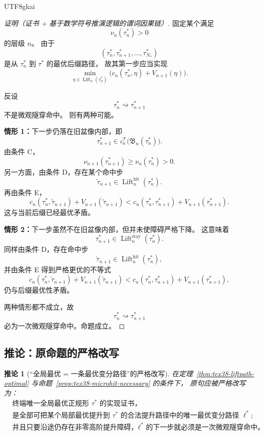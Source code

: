 \documentclass[12pt]{article}
\newtheorem{corollary}{推论}[section]
\newcommand{\Lift}{\operatorname{Lift}}
\begin{document}
\begin{CJK*}{UTF8}{gkai}
\begin{proof}[证明（证书 + 基于数学符号推演逻辑的谓词因果链）]
固定某个满足
\[
  \nu_n(\tau_n^\ast)>0
\]
的层级 $n$。
由于
\[
  (\tau_n^\ast,\tau_{n+1}^\ast,\dots,\tau_{N_\ast}^\ast)
\]
是从 $\tau_n^\ast$ 到 $\tau^\ast$ 的最优后缀路径，
故其第一步应当实现
\[
  \min_{\eta\in\Lift_n(\tau_n^\ast)}
  \bigl(
    c_n(\tau_n^\ast,\eta)+V_{n+1}(\eta)
  \bigr).
\]

反设
\[
  \tau_n^\ast\rightsquigarrow\tau_{n+1}^\ast
\]
不是微观隧穿命中。
则有两种可能。

\textbf{情形 1：}下一步仍落在旧盆像内部，即
\[
  \tau_{n+1}^\ast\in \iota_n^{\mathcal T}\bigl(\mathfrak B_n(\tau_n^\ast)\bigr).
\]
由条件 C，
\[
  \nu_{n+1}(\tau_{n+1}^\ast)\ge \nu_n(\tau_n^\ast)>0.
\]
另一方面，由条件 D，存在某个命中步
\[
  \widetilde\tau_{n+1}\in\Lift_n^{\mathrm{hit}}(\tau_n^\ast).
\]
再由条件 E，
\[
  c_n(\tau_n^\ast,\widetilde\tau_{n+1})+V_{n+1}(\widetilde\tau_{n+1})
  <
  c_n(\tau_n^\ast,\tau_{n+1}^\ast)+V_{n+1}(\tau_{n+1}^\ast).
\]
这与当前后缀已经最优矛盾。

\textbf{情形 2：}下一步虽然不在旧盆像内部，但并未使障碍严格下降。
这意味着
\[
  \tau_{n+1}^\ast\in\Lift_n^{\mathrm{stay}}(\tau_n^\ast).
\]
同样由条件 D，存在命中步
\[
  \widetilde\tau_{n+1}\in\Lift_n^{\mathrm{hit}}(\tau_n^\ast),
\]
并由条件 E 得到严格更优的不等式
\[
  c_n(\tau_n^\ast,\widetilde\tau_{n+1})+V_{n+1}(\widetilde\tau_{n+1})
  <
  c_n(\tau_n^\ast,\tau_{n+1}^\ast)+V_{n+1}(\tau_{n+1}^\ast),
\]
仍与后缀最优性矛盾。

两种情形都不成立，故
\[
  \tau_n^\ast\rightsquigarrow\tau_{n+1}^\ast
\]
必为一次微观隧穿命中。命题成立。
\end{proof}

\subsection{推论：原命题的严格改写}
\label{subsec:tex38-liftpath-corollary}

\begin{corollary}[“全局最优 = 一条最优变分路径”的严格改写]
\label{cor:tex38-liftpath-strict}
在定理~\ref{thm:tex38-liftpath-optimal} 与命题~\ref{prop:tex38-microhit-necessary} 的条件下，
原句应被严格改写为：
\[
  \begin{aligned}
    &\text{终端唯一全局最优正规形 }\tau^\ast\text{ 的实现证书，}\\
    &\text{是全部可把某个局部最优提升到 }\tau^\ast\text{ 的合法提升路径中的唯一最优变分路径 }\ell^\ast;\\
    &\text{并且只要沿途仍存在非零高阶提升障碍，}\ell^\ast\text{ 的下一步就必须是一次微观隧穿命中。}
  \end{aligned}
\]
\end{corollary}


\end{CJK*}
\end{document}
